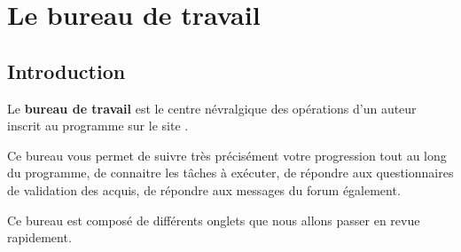 % 
% 
% 
% 
% 
% 
% 
% 

\chapter{Le bureau de travail}\hypertarget{bureautravail}{}\label{bureautravail}

\section{Introduction}\hypertarget{introduction-bureau}{}\label{introduction-bureau}

Le \textbf{bureau de travail} est le centre névralgique des opérations d'un auteur inscrit au programme \unan{} sur le site \boa{}.


Ce bureau vous permet de suivre très précisément votre progression tout au long du programme, de connaitre les tâches à exécuter, de répondre aux questionnaires de validation des acquis, de répondre aux messages du forum également.

Ce bureau est composé de différents onglets que nous allons passer en revue rapidement.

